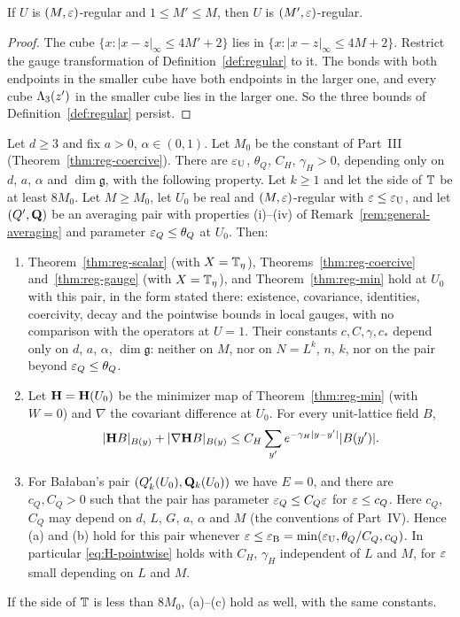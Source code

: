 \begin{lemma}\label{lem:regular-monotone}
If $U$ is $(M,\varepsilon)$-regular and $1\le M'\le M$, then $U$ is $(M',\varepsilon)$-regular.
\end{lemma}

\begin{proof}
The cube $\{x:|x-z|_\infty\le4M'+2\}$ lies in $\{x:|x-z|_\infty\le4M+2\}$. Restrict the gauge transformation of Definition~\ref{def:regular} to it. The bonds with both endpoints in the smaller cube have both endpoints in the larger one, and every cube $\Lambda_3(z')$ in the smaller cube lies in the larger one. So the three bounds of Definition~\ref{def:regular} persist.
\end{proof}

\begin{lemma}\label{lem:uniformity}
Let $d\ge3$ and fix $a>0$, $\alpha\in(0,1)$. Let $M_0$ be the constant of Part~III (Theorem~\ref{thm:reg-coercive}). There are $\varepsilon_{\rm U}$, $\theta_Q$, $C_H$, $\gamma_H>0$, depending only on $d$, $a$, $\alpha$ and $\dim\mathfrak g$, with the following property. Let $k\ge1$ and let the side of $\mathbb T$ be at least $8M_0$. Let $M\ge M_0$, let $U_0$ be real and $(M,\varepsilon)$-regular with $\varepsilon\le\varepsilon_{\rm U}$, and let $(Q',\mathbf Q)$ be an averaging pair with properties (i)--(iv) of Remark~\ref{rem:general-averaging} and parameter $\varepsilon_Q\le\theta_Q$ at $U_0$. Then:
\begin{enumerate}[label=(\alph*)]
\item Theorem~\ref{thm:reg-scalar} (with $X=\mathbb T_\eta$), Theorems~\ref{thm:reg-coercive} and~\ref{thm:reg-gauge} (with $X=\mathbb T_\eta$), and Theorem~\ref{thm:reg-min} hold at $U_0$ with this pair, in the form stated there: existence, covariance, identities, coercivity, decay and the pointwise bounds in local gauges, with no comparison with the operators at $U=1$. Their constants $c,C,\gamma,c_*$ depend only on $d$, $a$, $\alpha$, $\dim\mathfrak g$: neither on $M$, nor on $N=L^k$, $n$, $k$, nor on the pair beyond $\varepsilon_Q\le\theta_Q$.
\item Let $\mathbf H=\mathbf H(U_0)$ be the minimizer map of Theorem~\ref{thm:reg-min} (with $W=0$) and $\nabla$ the covariant difference at $U_0$. For every unit-lattice field $B$,
\begin{equation}\label{eq:H-pointwise}
|\mathbf H B|_{B(y)}+|\nabla\mathbf H B|_{B(y)}\le C_H\sum_{y'}e^{-\gamma_H|y-y'|}|B(y')| .
\end{equation}
\item For Ba\l aban's pair $(Q'_k(U_0),\mathbf Q_k(U_0))$ we have $E=0$, and there are $c_Q,C_Q>0$ such that the pair has parameter $\varepsilon_Q\le C_Q\varepsilon$ for $\varepsilon\le c_Q$. Here $c_Q$, $C_Q$ may depend on $d$, $L$, $G$, $a$, $\alpha$ and $M$ (the conventions of Part~IV). Hence (a) and (b) hold for this pair whenever $\varepsilon\le\varepsilon_{\rm B}=\min(\varepsilon_{\rm U},\theta_Q/C_Q,c_Q)$. In particular \eqref{eq:H-pointwise} holds with $C_H$, $\gamma_H$ independent of $L$ and $M$, for $\varepsilon$ small depending on $L$ and $M$.
\end{enumerate}
If the side of $\mathbb T$ is less than $8M_0$, (a)--(c) hold as well, with the same constants.
\end{lemma}

